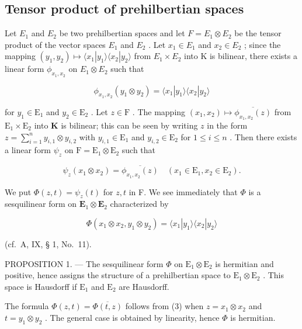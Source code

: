 \subsection{Tensor product of prehilbertian spaces}

Let \(E_{1}\) and \(E_{2}\) be two prehilbertian spaces and let \(F = E_{1} \otimes E_{2}\) be the tensor product of the vector spaces \(E_{1}\) and \(E_{2}\) . Let \(x_{1} \in E_{1}\) and \(x_{2} \in E_{2}\) ; since the mapping \((y_{1}, y_{2}) \mapsto \langle x_{1}|y_{1} \rangle \langle x_{2}|y_{2} \rangle\) from \(E_{1} \times E_{2}\) into K is bilinear, there exists a linear form \(\phi_{x_{1},x_{2}}\) on \(E_{1} \otimes E_{2}\) such that

\[
\phi_ {x _ {1}, x _ {2}} (y _ {1} \otimes y _ {2}) = \langle x _ {1} | y _ {1} \rangle \langle x _ {2} | y _ {2} \rangle\tag{1}
\]

for \(y_{1} \in \mathrm{E}_{1}\) and \(y_{2} \in \mathrm{E}_{2}\) . Let \(z \in \mathrm{F}\) . The mapping \((x_{1}, x_{2}) \mapsto \overline{\phi_{x_{1},x_{2}}(z)}\) from \(\mathrm{E}_1 \times \mathrm{E}_2\) into \(\mathbf{K}\) is bilinear; this can be seen by writing \(z\) in the form \(z = \sum_{i=1}^{n} y_{i,1} \otimes y_{i,2}\) with \(y_{i,1} \in \mathrm{E}_1\) and \(y_{i,2} \in \mathrm{E}_2\) for \(1 \leqslant i \leqslant n\) . Then there exists a linear form \(\psi_z\) on \(\mathrm{F} = \mathrm{E}_1 \otimes \mathrm{E}_2\) such that

\[
\psi_ {z} (x _ {1} \otimes x _ {2}) = \overline {{\phi_ {x _ {1} , x _ {2}} (z)}} \quad (x _ {1} \in \mathrm{E} _ {1}, x _ {2} \in \mathrm{E} _ {2}).\tag{2}
\]

We put \(\Phi(z, t) = \psi_z(t)\) for \(z, t\) in F. We see immediately that \(\Phi\) is a sesquilinear form on \(\mathbf{E}_1 \otimes \mathbf{E}_2\) characterized by

\[
\Phi (x _ {1} \otimes x _ {2}, y _ {1} \otimes y _ {2}) = \langle x _ {1} | y _ {1} \rangle \langle x _ {2} | y _ {2} \rangle\tag{3}
\]

(cf.~A, IX, § 1, No.~11).

PROPOSITION 1. --- The sesquilinear form \(\Phi\) on \(\mathrm{E}_1 \otimes \mathrm{E}_2\) is hermitian and positive, hence assigns the structure of a prehilbertian space to \(\mathrm{E}_1 \otimes \mathrm{E}_2\) . This space is Hausdorff if \(\mathrm{E}_1\) and \(\mathrm{E}_2\) are Hausdorff.

The formula \(\Phi(z, t) = \overline{\Phi(t, z)}\) follows from (3) when \(z = x_1 \otimes x_2\) and \(t = y_1 \otimes y_2\) . The general case is obtained by linearity, hence \(\Phi\) is hermitian.

